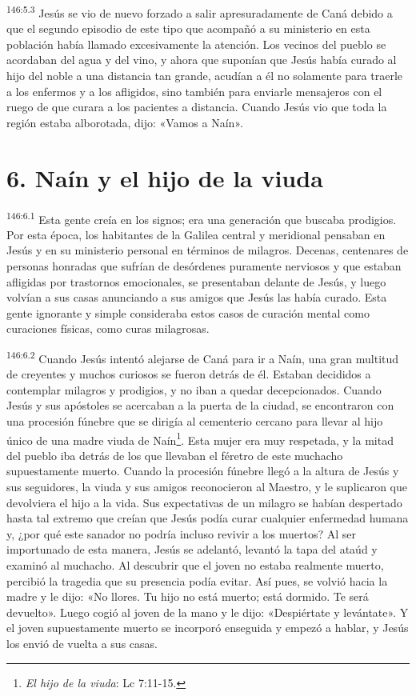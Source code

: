 \par
\textsuperscript{146:5.3} Jesús se vio de nuevo forzado a salir apresuradamente de Caná debido a que el segundo episodio de este tipo que acompañó a su ministerio en esta población había llamado excesivamente la atención. Los vecinos del pueblo se acordaban del agua y del vino, y ahora que suponían que Jesús había curado al hijo del noble a una distancia tan grande, acudían a él no solamente para traerle a los enfermos y a los afligidos, sino también para enviarle mensajeros con el ruego de que curara a los pacientes a distancia. Cuando Jesús vio que toda la región estaba alborotada, dijo: «Vamos a Naín».

\section*{6. Naín y el hijo de la viuda}
\par
\textsuperscript{146:6.1} Esta gente creía en los signos; era una generación que buscaba prodigios. Por esta época, los habitantes de la Galilea central y meridional pensaban en Jesús y en su ministerio personal en términos de milagros. Decenas, centenares de personas honradas que sufrían de desórdenes puramente nerviosos y que estaban afligidas por trastornos emocionales, se presentaban delante de Jesús, y luego volvían a sus casas anunciando a sus amigos que Jesús las había curado. Esta gente ignorante y simple consideraba estos casos de curación mental como curaciones físicas, como curas milagrosas.

\par
\textsuperscript{146:6.2} Cuando Jesús intentó alejarse de Caná para ir a Naín, una gran multitud de creyentes y muchos curiosos se fueron detrás de él. Estaban decididos a contemplar milagros y prodigios, y no iban a quedar decepcionados. Cuando Jesús y sus apóstoles se acercaban a la puerta de la ciudad, se encontraron con una procesión fúnebre que se dirigía al cementerio cercano para llevar al hijo único de una madre viuda de Naín\footnote{\textit{El hijo de la viuda}: Lc 7:11-15.}. Esta mujer era muy respetada, y la mitad del pueblo iba detrás de los que llevaban el féretro de este muchacho supuestamente muerto. Cuando la procesión fúnebre llegó a la altura de Jesús y sus seguidores, la viuda y sus amigos reconocieron al Maestro, y le suplicaron que devolviera el hijo a la vida. Sus expectativas de un milagro se habían despertado hasta tal extremo que creían que Jesús podía curar cualquier enfermedad humana y, ¿por qué este sanador no podría incluso revivir a los muertos? Al ser importunado de esta manera, Jesús se adelantó, levantó la tapa del ataúd y examinó al muchacho. Al descubrir que el joven no estaba realmente muerto, percibió la tragedia que su presencia podía evitar. Así pues, se volvió hacia la madre y le dijo: «No llores. Tu hijo no está muerto; está dormido. Te será devuelto». Luego cogió al joven de la mano y le dijo: «Despiértate y levántate». Y el joven supuestamente muerto se incorporó enseguida y empezó a hablar, y Jesús los envió de vuelta a sus casas.


